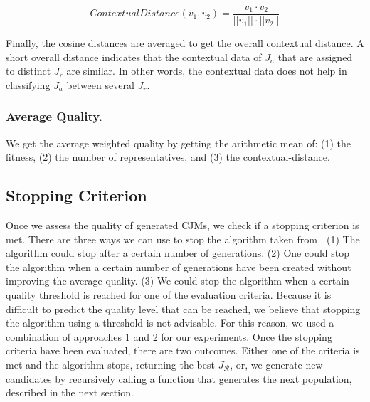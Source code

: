 \documentclass[runningheads]{llncs}
\begin{document}
{{\begin{equation}
    ContextualDistance({v_{1}}, {v_{2}}) = \frac{v_{1} \cdot v_{2}}{||v_{1} ||\cdot||v_{2}||} 
\end{equation}

Finally, the cosine distances are averaged to get the overall contextual distance. A short overall distance indicates that the contextual data of $J_a$ that are assigned to distinct $J_r$ are similar. In other words, the contextual data does not help in classifying $J_a$ between several $J_r$. 

\subsubsection{Average Quality. } We get the average weighted quality by getting the arithmetic mean of: (1) the fitness, (2) the number of representatives, and (3) the contextual-distance. 

\subsection{Stopping Criterion}
{Once we assess the quality of generated CJMs, we check if a stopping criterion is met.} There are three ways we can use to stop the algorithm taken from \cite{buijs2012genetic,de2005genetic}. (1) The algorithm could stop after a certain number of generations. (2) One could stop the algorithm when a certain number of generations have been created without improving the average quality. (3) We could stop the algorithm when a certain quality threshold is reached for one of the evaluation criteria. Because it is difficult to predict the quality level that can be reached, we believe that stopping the algorithm using a threshold is not advisable. For this reason, we used a combination of approaches 1 and 2 for our experiments. Once the stopping criteria have been evaluated, there are two outcomes. Either one of the criteria is met and the algorithm stops, returning the best $J_{\mathcal{R}}$, or, {we generate new candidates} by recursively calling a function that generates the next population, described in the next section.

}}
\end{document}
